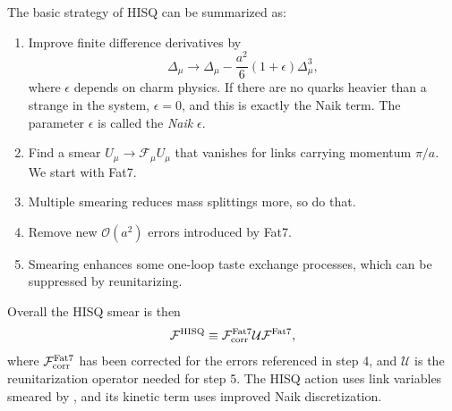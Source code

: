 The basic strategy of HISQ can be summarized as:
\begin{enumerate}
  \item Improve finite difference derivatives by 
        \vspace{-1mm}
        \begin{equation*}
         \Delta_\mu\to\Delta_\mu-\frac{a^2}{6}(1+\epsilon)\Delta_\mu^3,
        \end{equation*}
        where $\epsilon$ depends on charm physics. If there are no quarks
        heavier than a strange in the system, $\epsilon=0$, and this is
        exactly the Naik term. The parameter $\epsilon$ is called
        the {\it Naik} $\epsilon$.
  \item Find a smear $U_\mu\to\mathcal{F}_\mu U_\mu$ that vanishes
        for links carrying momentum $\pi/a$. We start with
        Fat7.
  \item Multiple smearing reduces mass splittings more, so do that.
  \item Remove new $\mathcal{O}(a^2)$ errors introduced by Fat7.
  \item Smearing enhances some one-loop taste exchange processes,
        which can be suppressed by reunitarizing.
\end{enumerate}
Overall the HISQ smear is then
\begin{equation}\label{eq:HISQsmear}
\mathcal{F}^{\rm HISQ}\equiv
\mathcal{F}^{\rm Fat7}_{\rm corr}\mathcal{U}\mathcal{F}^{\rm Fat7},
\end{equation}
where $\mathcal{F}^{\rm Fat7}_{\rm corr}$ has been corrected for the
errors referenced in step 4, and $\mathcal{U}$ is the reunitarization
operator needed for step 5. The HISQ action uses link variables smeared
by , and its kinetic term uses improved
Naik discretization.

